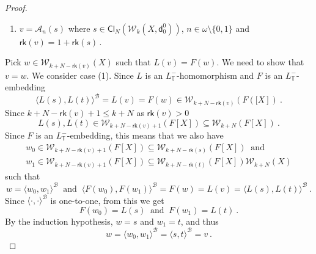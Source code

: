 \documentclass[10pt,a4paper]{amsart}
\begin{document}
\begin{proof}
\begin{enumerate}
 
 
 
 

\item  $  v  =   \mathcal{A}_n \left(  s  \right)   $  where  
$  s  \in    \mathsf{Cl}_{N}  \left(  \mathcal{W}_{k}  \left( X     ,   \mathsf{d}^0_0      \right)   \right)    $, 
  $ n  \in  \omega  \setminus  \lbrace 0, 1  \rbrace   $
  and  $  \mathsf{rk} \left(  v  \right)  =  1  +  \mathsf{rk} \left(  s \right)      \,   $. 
 \end{enumerate}
Pick     $  w  \in  \mathcal{W}_{k + N- \mathsf{rk} \left( v  \right)  }  \left( X  \right)    $
such that  $  L(v)  =  F(w)  $.  
We need to show that  $  v  =  w  $. 
We consider  case  (1). 
Since  $L$ is an $L_{  \mathbb{T} }^-  $-homomorphism  and  $F$  is  an   $L_{  \mathbb{T} }^-  $-embedding
\[
\langle  L(s), L(t)   \rangle^{  \mathcal{B}  } 
= L(v)  = F(w)   \in  
 \mathcal{W}_{k + N- \mathsf{rk} \left(   v \right)  }  \left(   F  \left([ X  \right]   \right)   
 \     . 
\]
Since  $   k + N- \mathsf{rk}  \left(   v \right)  +1  \leq  k+N $  as  $   \mathsf{rk}  \left(   v \right)   >  0  $
\[
  L(s), L(t)  \in       
   \mathcal{W}_{ k + N  - \mathsf{rk}  \left(   v \right)  +1  }  \left(     F  \left[  X   \right]   \right)  
  \subseteq   \mathcal{W}_{ k + N  }  \left(     F  \left[  X   \right]   \right)  
  \      .
  \]
Since  $  F$ is an  $L_{  \mathbb{T} }^-  $-embedding, this means that we also have  
\begin{multline*}
 w_0    \in     \mathcal{W}_{ k + N  - \mathsf{rk}  \left(   v \right)  +1  }  \left(     F  \left[  X   \right]   \right)  
\subseteq  
   \mathcal{W}_{ k + N  - \mathsf{rk}  \left(   s \right)   }  \left(     F  \left[  X   \right]   \right)  
\     \mbox{  and   }      \   
\\
 w_1    \in     \mathcal{W}_{ k + N  - \mathsf{rk}  \left(   v \right)  +1  }  \left(     F  \left[  X   \right]   \right)  
\subseteq  
   \mathcal{W}_{ k + N  - \mathsf{rk}  \left(   t \right)   }  \left(     F  \left[  X   \right]   \right)  
 \mathcal{W}_{k + N }  \left( X  \right)    
   \end{multline*}
such that   
\[
   w  =  \langle  w_0, w_1  \rangle^{  \mathcal{B}  }  
\    \mbox{  and   }          \   
\langle  F(w_0) ,   F(w_1)  \rangle^{  \mathcal{B}  }  
= F(w)  =  L(v)  
= 
\langle  L(s), L(t)   \rangle^{  \mathcal{B}  } 
\     .
\]
Since  $  \langle  \cdot  ,  \cdot   \rangle^{  \mathcal{B}  }   $ is one-to-one,  from this  we get 
\[
 F(w_0)  =  L(s)      \    \mbox{  and  }      \         F(w_1)  = L(t)  
 \       .
 \]
By the induction hypothesis,   $  w =  s  $  and  $  w_1  =  t  $,  
and thus  
\[
  w  =  \langle  w_0,  w_1  \rangle^{  \mathcal{B} }   =     \langle  s,  t \rangle^{  \mathcal{B} }     =  v  
  \     .
  \]
 








\end{proof}
\end{document}
